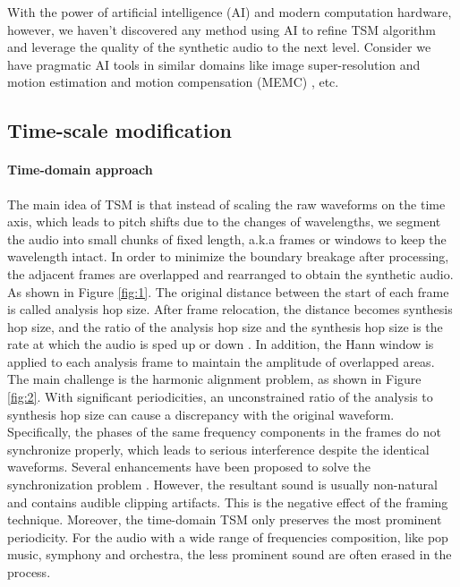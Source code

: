 \documentclass[12pt]{article}
\begin{document}
With the power of artificial intelligence (AI) and modern computation hardware, however, we haven't discovered any method using AI to refine TSM algorithm and leverage the quality of the synthetic audio to the next level. Consider we have pragmatic AI tools in similar domains like image super-resolution \cite{led17} and motion estimation and motion compensation (MEMC) \cite{bao21}, etc.

\subsection{Time-scale modification}
\paragraph{Time-domain approach}
The main idea of TSM is that instead of scaling the raw waveforms on the time axis, which leads to pitch shifts due to the changes of wavelengths, we segment the audio into small chunks of fixed length, a.k.a frames or windows to keep the wavelength intact. In order to minimize the boundary breakage after processing, the adjacent frames are overlapped and rearranged to obtain the synthetic audio. As shown in Figure \ref{fig:1}. The original distance between the start of each frame is called analysis hop size. After frame relocation, the distance becomes synthesis hop size, and the ratio of the analysis hop size and the synthesis hop size is the rate at which the audio is sped up or down \cite{dri16}. In addition, the Hann window \cite{ess86} is applied to each analysis frame to maintain the amplitude of overlapped areas. The main challenge is the harmonic alignment problem, as shown in Figure \ref{fig:2}. With significant periodicities, an unconstrained ratio of the analysis to synthesis hop size can cause a discrepancy with the original waveform. Specifically, the phases of the same frequency components in the frames do not synchronize properly, which leads to serious interference despite the identical waveforms. Several enhancements have been proposed to solve the synchronization problem \cite{hej91}\cite{eri90}\cite{ver93}. However, the resultant sound is usually non-natural and contains audible clipping artifacts. This is the negative effect of the framing technique. Moreover, the time-domain TSM only preserves the most prominent periodicity. For the audio with a wide range of frequencies composition, like pop music, symphony and orchestra, the less prominent sound are often erased in the process.
\end{document}
